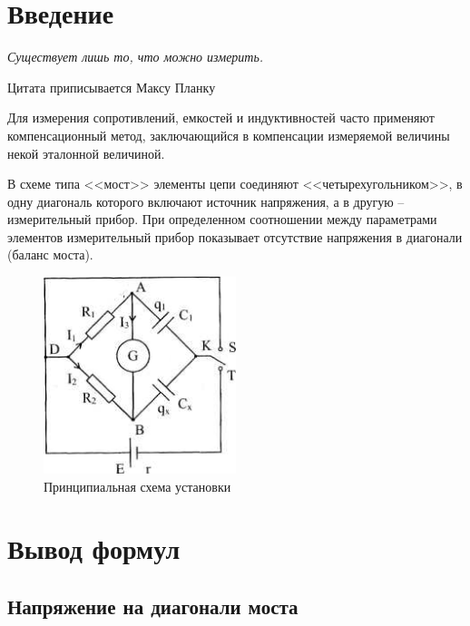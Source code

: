 \documentclass[a4paper,12pt]{extarticle}
\def\source{templates}
\begin{document}

\tableofcontents
\newpage

\section*{Введение} %
\label{sec:input}
\epigraph{\textit{Существует лишь то, что можно измерить.}}
{Цитата приписывается Максу Планку}


 Для измерения сопротивлений, емкостей и индуктивностей  часто  применяют
компенсационный метод, заключающийся в компенсации измеряемой величины некой эталонной величиной. 

В схеме типа <<мост>> элементы цепи соединяют  <<четырехугольником>>, в одну диагональ  которого  включают  источник  напряжения,  а  в  другую  --
измерительный  прибор.  При  определенном  соотношении   между   параметрами
элементов измерительный прибор показывает отсутствие напряжения в  диагонали
(баланс моста).

\begin{figure}[H]
	\centering
	\includegraphics[width=0.5\textwidth]{img/chem}
	\caption{Принципиальная схема установки}
	\label{fig:figure1}
\end{figure}

\newpage
\section{Вывод формул}
\subsection{Напряжение на диагонали моста}
\end{document}
